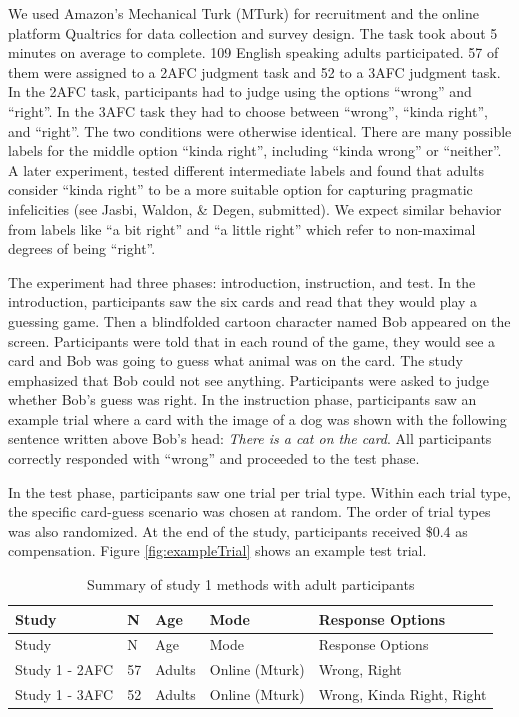 \documentclass[floatsintext,man]{apa6}
\theoremstyle{definition}
\theoremstyle{definition}
\theoremstyle{definition}
\theoremstyle{remark}
\begin{document}
We used Amazon's Mechanical Turk (MTurk) for recruitment and the online
platform Qualtrics for data collection and survey design. The task took
about 5 minutes on average to complete. 109 English speaking adults
participated. 57 of them were assigned to a 2AFC judgment task and 52 to
a 3AFC judgment task. In the 2AFC task, participants had to judge using
the options \enquote{wrong} and \enquote{right}. In the 3AFC task they
had to choose between \enquote{wrong}, \enquote{kinda right}, and
\enquote{right}. The two conditions were otherwise identical. There are
many possible labels for the middle option \enquote{kinda right},
including \enquote{kinda wrong} or \enquote{neither}. A later
experiment, tested different intermediate labels and found that adults
consider \enquote{kinda right} to be a more suitable option for
capturing pragmatic infelicities (see Jasbi, Waldon, \& Degen,
submitted). We expect similar behavior from labels like \enquote{a bit
right} and \enquote{a little right} which refer to non-maximal degrees
of being \enquote{right}.

The experiment had three phases: introduction, instruction, and test. In
the introduction, participants saw the six cards and read that they
would play a guessing game. Then a blindfolded cartoon character named
Bob appeared on the screen. Participants were told that in each round of
the game, they would see a card and Bob was going to guess what animal
was on the card. The study emphasized that Bob could not see anything.
Participants were asked to judge whether Bob's guess was right. In the
instruction phase, participants saw an example trial where a card with
the image of a dog was shown with the following sentence written above
Bob's head: \emph{There is a cat on the card}. All participants
correctly responded with \enquote{wrong} and proceeded to the test
phase.

In the test phase, participants saw one trial per trial type. Within
each trial type, the specific card-guess scenario was chosen at random.
The order of trial types was also randomized. At the end of the study,
participants received \$0.4 as compensation. Figure
\ref{fig:exampleTrial} shows an example test trial.

\begin{longtable}[]{@{}lllll@{}}
\caption{\label{tab:study1info}Summary of study 1 methods with adult
participants}\tabularnewline
\toprule
Study & N & Age & Mode & Response Options\tabularnewline
\midrule
\endfirsthead
\toprule
Study & N & Age & Mode & Response Options\tabularnewline
\midrule
\endhead
Study 1 - 2AFC & 57 & Adults & Online (Mturk) & Wrong,
Right\tabularnewline
Study 1 - 3AFC & 52 & Adults & Online (Mturk) & Wrong, Kinda Right,
Right\tabularnewline
\bottomrule
\end{longtable}
\end{document}

